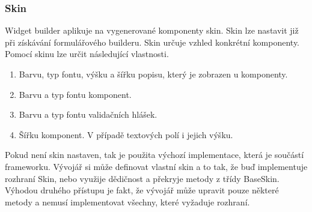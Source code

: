 \subsubsection{Skin}
Widget builder aplikuje na vygenerované komponenty skin. Skin lze nastavit již při získávání formulářového builderu. Skin určuje vzhled konkrétní komponenty. Pomocí skinu lze určit následující vlastnosti.
\begin{enumerate}
\item Barvu, typ fontu, výšku a šířku popisu, který je zobrazen u komponenty.
\item Barvu a typ fontu komponent.
\item Barvu a typ fontu validačních hlášek.
\item Šířku komponent. V případě textových polí i jejich výšku.
\end{enumerate}
Pokud není skin nastaven, tak je použita výchozí implementace, která je součástí frameworku. Vývojář si může definovat vlastní skin a to tak, že buď implementuje rozhraní Skin, nebo využije dědičnost a překryje metody z třídy BaseSkin. Výhodou druhého přístupu je fakt, že vývojář může upravit pouze některé metody a nemusí implementovat všechny, které vyžaduje rozhraní.
